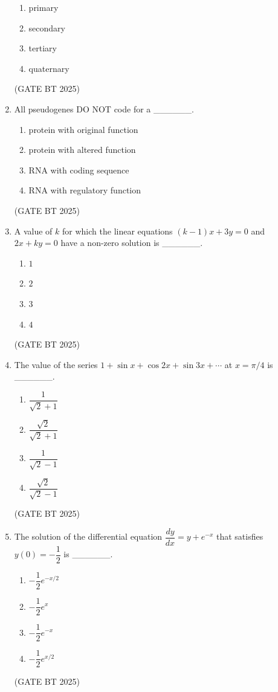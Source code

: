 \documentclass[journal,12pt,onecolumn]{IEEEtran}
\theoremstyle{remark}
\begin{document}
\begin{enumerate}
\begin{enumerate}
    \item primary
    \item secondary
    \item tertiary
    \item quaternary
\end{enumerate}
\hfill(GATE BT 2025)

\item 
All pseudogenes DO NOT code for a \_\_\_\_\_\_.

\begin{enumerate}
    \item protein with original function
    \item protein with altered function
    \item RNA with coding sequence
    \item RNA with regulatory function
\end{enumerate}
\hfill(GATE BT 2025)

\item 
A value of $k$ for which the linear equations $(k-1)x+3y=0$ and $2x+ky=0$ have a non-zero solution is \_\_\_\_\_\_.

\begin{enumerate}
    \item $1$
    \item $2$
    \item $3$
    \item $4$
\end{enumerate}
\hfill(GATE BT 2025)

\item 
The value of the series $1+\sin x+\cos 2x+\sin 3x+\cdots$ at $x=\pi/4$ is \_\_\_\_\_\_.

\begin{enumerate}
    \item $\dfrac{1}{\sqrt{2}+1}$
    \item $\dfrac{\sqrt{2}}{\sqrt{2}+1}$
    \item $\dfrac{1}{\sqrt{2}-1}$
    \item $\dfrac{\sqrt{2}}{\sqrt{2}-1}$
\end{enumerate}
\hfill(GATE BT 2025)

\item 
The solution of the differential equation $\dfrac{dy}{dx}=y+e^{-x}$ that satisfies $y(0)=-\dfrac{1}{2}$ is \_\_\_\_\_\_.

\begin{enumerate}
    \item $-\dfrac{1}{2}e^{-x/2}$
    \item $-\dfrac{1}{2}e^{x}$
    \item $-\dfrac{1}{2}e^{-x}$
    \item $-\dfrac{1}{2}e^{x/2}$
\end{enumerate}
\hfill(GATE BT 2025)


\end{enumerate}
\end{document}

